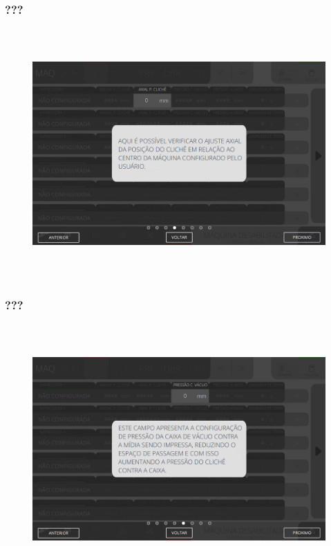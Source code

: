 \newpage
\thispagestyle{fancy}
\vspace*{\fill}
\subsubsection{\small{???}}
\begin{figure}[h]
  \centering
  \includegraphics[width=576px,height=360px]{src/imagesFlexo/04-printter/01-printters/settings/e-4.png}
   \label{}
\end{figure}
\vspace*{\fill}

\newpage
\thispagestyle{fancy}
\vspace*{\fill}
\subsubsection{\small{???}}
\begin{figure}[h]
  \centering
  \includegraphics[width=576px,height=360px]{src/imagesFlexo/04-printter/01-printters/settings/e-5.png}
   \label{}
\end{figure}
\vspace*{\fill}

